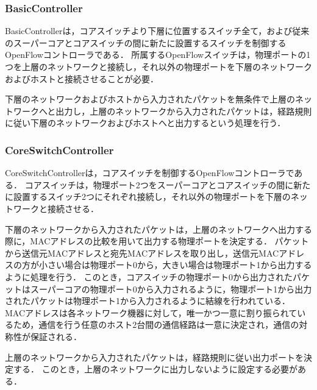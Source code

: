 \subsubsection{BasicController}

BasicControllerは，コアスイッチより下層に位置するスイッチ全て，および従来のスーパーコアとコアスイッチの間に新たに設置するスイッチを制御するOpenFlowコントローラである．
所属するOpenFlowスイッチは，物理ポートの1つを上層のネットワークと接続し，それ以外の物理ポートを下層のネットワークおよびホストと接続させることが必要．

下層のネットワークおよびホストから入力されたパケットを無条件で上層のネットワークへと出力し，上層のネットワークから入力されたパケットは，経路規則に従い下層のネットワークおよびホストへと出力するという処理を行う．

\subsubsection{CoreSwitchController}

CoreSwitchControllerは，コアスイッチを制御するOpenFlowコントローラである．
コアスイッチは，物理ポート2つをスーパーコアとコアスイッチの間に新たに設置するスイッチ2つにそれぞれ接続し，それ以外の物理ポートを下層のネットワークと接続させる．

下層のネットワークから入力されたパケットは，上層のネットワークへ出力する際に，MACアドレスの比較を用いて出力する物理ポートを決定する．
パケットから送信元MACアドレスと宛先MACアドレスを取り出し，送信元MACアドレスの方が小さい場合は物理ポート0から，大きい場合は物理ポート1から出力するように処理を行う．
このとき，コアスイッチの物理ポート0から出力されたパケットはスーパーコアの物理ポート0から入力されるように，物理ポート1から出力されたパケットは物理ポート1から入力されるように結線を行われている．
MACアドレスは各ネットワーク機器に対して，唯一かつ一意に割り振られているため，通信を行う任意のホスト2台間の通信経路は一意に決定され，通信の対称性が保証される．

上層のネットワークから入力されたパケットは，経路規則に従い出力ポートを決定する．
このとき，上層のネットワークに出力しないように設定する必要がある．